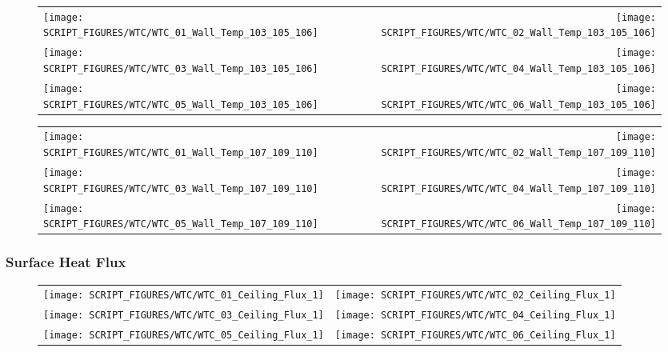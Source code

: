 \begin{figure}[!ht]
\begin{tabular*}{\textwidth}{l@{\extracolsep{\fill}}r}
\texttt{[image: SCRIPT\_FIGURES/WTC/WTC\_01\_Wall\_Temp\_103\_105\_106]} &
\texttt{[image: SCRIPT\_FIGURES/WTC/WTC\_02\_Wall\_Temp\_103\_105\_106]} \\
\texttt{[image: SCRIPT\_FIGURES/WTC/WTC\_03\_Wall\_Temp\_103\_105\_106]} &
\texttt{[image: SCRIPT\_FIGURES/WTC/WTC\_04\_Wall\_Temp\_103\_105\_106]} \\
\texttt{[image: SCRIPT\_FIGURES/WTC/WTC\_05\_Wall\_Temp\_103\_105\_106]} &
\texttt{[image: SCRIPT\_FIGURES/WTC/WTC\_06\_Wall\_Temp\_103\_105\_106]}
\end{tabular*}
\label{NIST_WTC_Wall_103_105_106}
\end{figure}

\begin{figure}[!ht]
\begin{tabular*}{\textwidth}{l@{\extracolsep{\fill}}r}
\texttt{[image: SCRIPT\_FIGURES/WTC/WTC\_01\_Wall\_Temp\_107\_109\_110]} &
\texttt{[image: SCRIPT\_FIGURES/WTC/WTC\_02\_Wall\_Temp\_107\_109\_110]} \\
\texttt{[image: SCRIPT\_FIGURES/WTC/WTC\_03\_Wall\_Temp\_107\_109\_110]} &
\texttt{[image: SCRIPT\_FIGURES/WTC/WTC\_04\_Wall\_Temp\_107\_109\_110]} \\
\texttt{[image: SCRIPT\_FIGURES/WTC/WTC\_05\_Wall\_Temp\_107\_109\_110]} &
\texttt{[image: SCRIPT\_FIGURES/WTC/WTC\_06\_Wall\_Temp\_107\_109\_110]}
\end{tabular*}
\label{NIST_WTC_Wall_107_109_110}
\end{figure}

\clearpage

\subsubsection{Surface Heat Flux}

\begin{figure}[h!]
\begin{tabular*}{\textwidth}{l@{\extracolsep{\fill}}r}
\texttt{[image: SCRIPT\_FIGURES/WTC/WTC\_01\_Ceiling\_Flux\_1]} &
\texttt{[image: SCRIPT\_FIGURES/WTC/WTC\_02\_Ceiling\_Flux\_1]} \\
\texttt{[image: SCRIPT\_FIGURES/WTC/WTC\_03\_Ceiling\_Flux\_1]} &
\texttt{[image: SCRIPT\_FIGURES/WTC/WTC\_04\_Ceiling\_Flux\_1]} \\
\texttt{[image: SCRIPT\_FIGURES/WTC/WTC\_05\_Ceiling\_Flux\_1]} &
\texttt{[image: SCRIPT\_FIGURES/WTC/WTC\_06\_Ceiling\_Flux\_1]}
\end{tabular*}
\end{figure}

